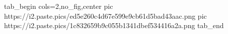  
 
 
 
 
\qqSecOrig

\ifcmt
  tab_begin cols=2,no_fig,center
     pic https://i2.paste.pics/ed5e260c4d67e599e9cb61d5bad43aac.png
     pic https://i2.paste.pics/1c832659b9c055b1341dbef534416a2a.png
  tab_end
\fi
